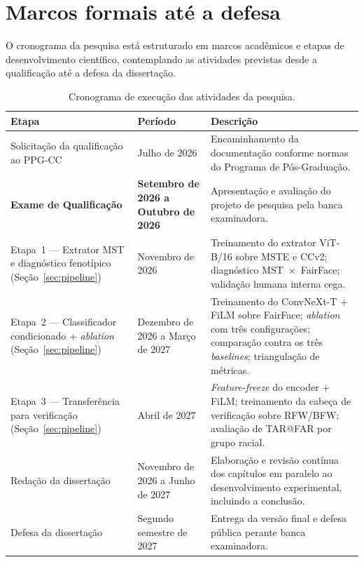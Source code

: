 \section{Marcos formais até a defesa}
\label{sec:cron_marcos}

O cronograma da pesquisa está estruturado em marcos acadêmicos e etapas de desenvolvimento científico, contemplando as atividades previstas desde a qualificação até a defesa da dissertação.

\begin{table}[htbp]
\centering
\small
\begin{tabular}{p{6.5cm}p{2.8cm}p{5.5cm}}
\toprule
\textbf{Etapa} & \textbf{Período} & \textbf{Descrição} \\
\midrule

Solicitação da qualificação ao PPG-CC & Julho de 2026 & Encaminhamento da documentação conforme normas do Programa de Pós-Graduação. \\

\textbf{Exame de Qualificação} & \textbf{Setembro de 2026 a Outubro de 2026} & Apresentação e avaliação do projeto de pesquisa pela banca examinadora. \\

Etapa~1 — Extrator MST e diagnóstico fenotípico (Seção~\ref{sec:pipeline}) & Novembro de 2026 & Treinamento do extrator ViT-B/16 sobre MSTE e CCv2; diagnóstico MST~$\times$~FairFace; validação humana interna cega. \\

Etapa~2 — Classificador condicionado + \emph{ablation} (Seção~\ref{sec:pipeline}) & Dezembro de 2026 a Março de 2027 & Treinamento do ConvNeXt-T + FiLM sobre FairFace; \emph{ablation} com três configurações; comparação contra os três \emph{baselines}; triangulação de métricas. \\

Etapa~3 — Transferência para verificação (Seção~\ref{sec:pipeline}) & Abril de 2027 & \emph{Feature-freeze} do encoder + FiLM; treinamento da cabeça de verificação sobre RFW/BFW; avaliação de TAR@FAR por grupo racial. \\

Redação da dissertação & Novembro de 2026 a Junho de 2027 & Elaboração e revisão contínua dos capítulos em paralelo ao desenvolvimento experimental, incluindo a conclusão. \\

Defesa da dissertação & Segundo semestre de 2027 & Entrega da versão final e defesa pública perante banca examinadora. \\
\bottomrule
\end{tabular}
\caption{Cronograma de execução das atividades da pesquisa.}
\label{tab:cronograma}
\end{table}

